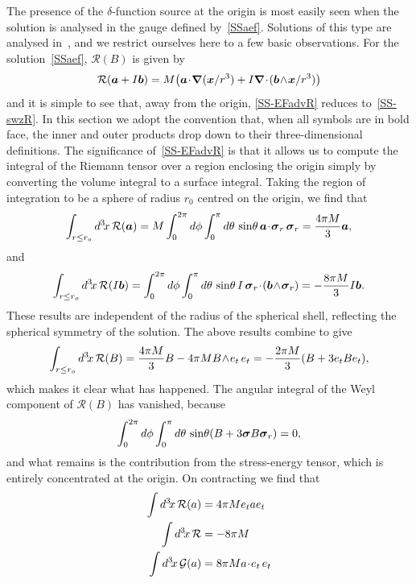 \documentclass[a4paper]{article}
\numberwithin{equation}{section}
\newcommand{\nn}{\nonumber}
\newcommand{\dt}{\! \cdot \!}
\newcommand{\wdg}{\! \wedge \!}
\newcommand{\del}{\delta}
\newcommand{\sig}{\mbox{\boldmath $\sigma$}}
\newcommand{\ba}{\mbox{\boldmath $a$}}
\newcommand{\bb}{\mbox{\boldmath $b$}}
\newcommand{\bx}{\mbox{\boldmath $x$}}
\newcommand{\bsig}{\mbox{\boldmath $\sig$}}
\newcommand{\clg}{{\mathcal{G}}}
\newcommand{\clr}{{\mathcal{R}}}
\newcommand{\sigr}{\bsig_r}
\newcommand{\grad}{\nabla}
\newcommand{\bgrad}{\mbox{\boldmath $\grad$}}
\newcommand{\ric}{{\cal R}}
\begin{document}
The presence of the $\del$-function source at the origin is most
easily seen when the solution is analysed in the gauge defined
by~\eqref{SSaef}.  Solutions of this type are analysed
in~\cite{DL04-KS}, and we restrict ourselves here to a few basic
observations.  For the solution~\eqref{SSaef}, $\clr(B)$ is given
by
%
\begin{equation}
\ric(\ba + I\bb) = M \bigl( \ba \dt \bgrad (\bx/r^3) + 
I \bgrad \dt (\bb \wdg \bx/r^3) \bigr) 
\label{SS-EFadvR}
\end{equation} 
%
and it is simple to see that, away from the origin, \eqref{SS-EFadvR}
reduces to~\eqref{SS-swzR}.  In this section we adopt the convention
that, when all symbols are in bold face, the inner and outer products
drop down to their three-dimensional definitions.  The significance
of~\eqref{SS-EFadvR} is that it allows us to compute the integral of
the Riemann tensor over a region enclosing the origin simply by
converting the volume integral to a surface integral.  Taking the
region of integration to be a sphere of radius $r_0$ centred on the
origin, we find that
%
\begin{equation}
\int_{r \leq r_o} d^3\!x \, \ric(\ba) = M \int_{0}^{2 \pi} d\phi
\int_{0}^{\pi}d \theta \, \sin\! \theta \, \ba \dt \sigr \, \sigr =
\frac{4 \pi M }{3} \ba, 
\end{equation}
%
and
%
\begin{equation}
\int_{r \leq r_o} d^3\!x \, \ric(I \bb) = \int_{0}^{2 \pi} d\phi
\int_{0}^{\pi}  d \theta \, \sin\! \theta \, I \, \sigr \dt(\bb \wdg
\sigr) = -\frac{8 \pi M }{3} I \bb.
\end{equation} 
%
These results are independent of the radius of the spherical shell,
reflecting the spherical symmetry of the solution.  The above results
combine to give
%
\begin{equation}
\int_{r \leq r_o} d^3\!x \, \ric(B)  = \frac{4 \pi M }{3}B - 4 \pi M
B\wdg e_t \, e_t = -\frac{2 \pi M }{3}(B + 3 e_t B e_t) ,
\end{equation} 
%
which makes it clear what has happened.  The angular integral of the
Weyl component of $\clr(B)$ has vanished, because
%
\begin{equation}
\int_{0}^{2 \pi} d\phi \int_{0}^{\pi}d \theta \, \sin\! \theta (B + 3
\sig B \sigr) = 0,
\end{equation}
%
and what remains is the contribution from the stress-energy tensor,
which is entirely concentrated at the origin.  On contracting we find
that
%
\begin{align}
\int d^3\!x \, \ric(a) &= 4 \pi M e_t a e_t \nn \\
\int d^3\!x \, \ric &= -8 \pi M \label{EFadvint} \\
\int d^3\!x \, \clg(a) &= 8 \pi M a \dt e_t \, e_t \nn 
\end{align}
\end{document}
